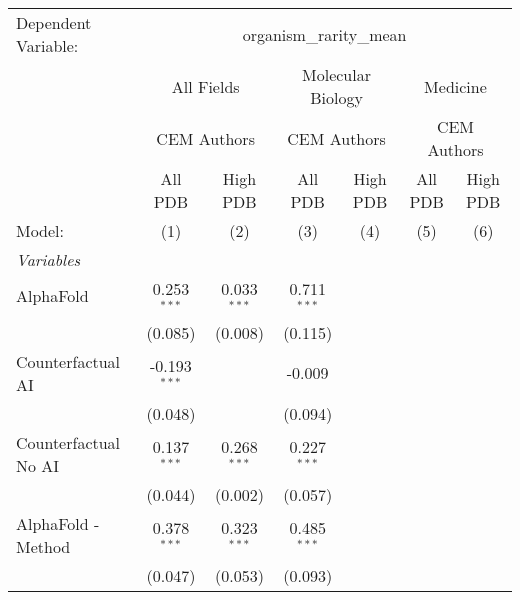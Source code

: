 \begingroup
\centering
\begin{tabular}{lcccccc}
   \tabularnewline \midrule \midrule
   Dependent Variable: & \multicolumn{6}{c}{organism\_rarity\_mean}\\
 & \multicolumn{2}{c}{All Fields} & \multicolumn{2}{c}{Molecular Biology} & \multicolumn{2}{c}{Medicine} \\
\cmidrule(lr){2-3} \cmidrule(lr){4-5} \cmidrule(lr){6-7}
 & \multicolumn{2}{c}{CEM Authors} & \multicolumn{2}{c}{CEM Authors} & \multicolumn{2}{c}{CEM Authors} \\
\cmidrule(lr){2-3} \cmidrule(lr){4-5} \cmidrule(lr){6-7}
 & \multicolumn{1}{c}{All PDB} & \multicolumn{1}{c}{High PDB} & \multicolumn{1}{c}{All PDB} & \multicolumn{1}{c}{High PDB} & \multicolumn{1}{c}{All PDB} & \multicolumn{1}{c}{High PDB} \\
\cmidrule(lr){2-2} \cmidrule(lr){3-3} \cmidrule(lr){4-4} \cmidrule(lr){5-5} \cmidrule(lr){6-6} \cmidrule(lr){7-7}
   Model:                                                     & (1)            & (2)           & (3)           & (4) & (5) & (6)\\  
   \midrule
   \emph{Variables}\\
   AlphaFold                                                  & 0.253$^{***}$  & 0.033$^{***}$ & 0.711$^{***}$ &     &     &   \\   
                                                              & (0.085)        & (0.008)       & (0.115)       &     &     &   \\   
   Counterfactual AI                                          & -0.193$^{***}$ &               & -0.009        &     &     &   \\   
                                                              & (0.048)        &               & (0.094)       &     &     &   \\   
   Counterfactual No AI                                       & 0.137$^{***}$  & 0.268$^{***}$ & 0.227$^{***}$ &     &     &   \\   
                                                              & (0.044)        & (0.002)       & (0.057)       &     &     &   \\   
   AlphaFold - Method                                         & 0.378$^{***}$  & 0.323$^{***}$ & 0.485$^{***}$ &     &     &   \\   
                                                              & (0.047)        & (0.053)       & (0.093)       &     &     &   \\   

\end{tabular}
